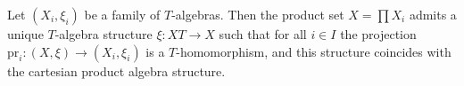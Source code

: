 Let $(X_i, \xi_i)$ be a family of $T$-algebras. Then the product set $X = \prod X_i$ admits a unique $T$-algebra structure $\xi: XT \longrightarrow X$ such that for all $i \in I$ the projection $\mathrm{pr}_i: (X, \xi) \longrightarrow (X_i, \xi_i)$ is a $T$-homomorphism, and this structure coincides with the cartesian product algebra structure.
